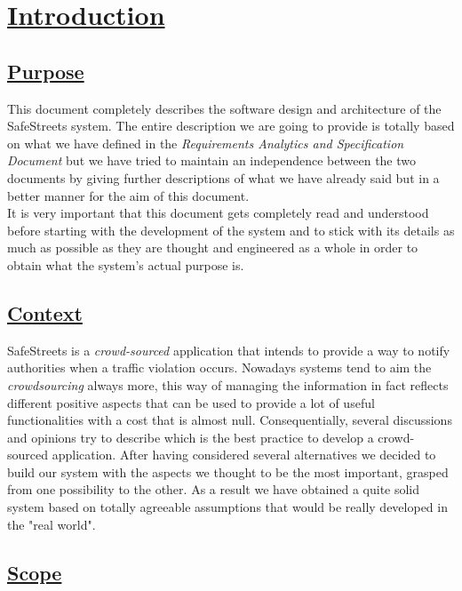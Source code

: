 \section[Introduction]{\hyperlink{toc}{Introduction}}
	\label{sec:introduction} 
	
	\subsection[Purpose]{\hyperlink{toc}{Purpose}}
		\label{sec:purpose}
		
			This document completely describes the software design and architecture of the SafeStreets system. The entire description we are going to provide is totally based on what we have defined in the \emph{Requirements Analytics and Specification Document} \cite{RASD} but we have tried to maintain an independence between the two documents by giving further descriptions of what we have already said but in a better manner for the aim of this document.\\
		
			It is very important that this document gets completely read and understood before starting with the development of the system and to stick with its details as much as possible as they are thought and engineered as a whole in order to obtain what the system's actual purpose is.
			
	\subsection[Context]{\hyperlink{toc}{Context}}
		\label{sec:context}
		
		SafeStreets is a \emph{crowd-sourced} application that intends to provide a way to notify authorities when a traffic violation occurs. Nowadays systems tend to aim the \emph{crowdsourcing} always more, this way of managing the information in fact reflects different positive aspects that can be used to provide a lot of useful functionalities with a cost that is almost null. Consequentially, several discussions and opinions try to describe which is the best practice to develop a crowd-sourced application. After having considered several alternatives we decided to build our system with the aspects we thought to be the most important, grasped from one possibility to the other. As a result we have obtained a quite solid system based on totally agreeable assumptions that would be really developed in the "real world". 
		
	\subsection[Scope]{\hyperlink{toc}{Scope}}
		\label{sec:scope}
		
